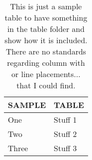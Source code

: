 \begin{table}[!ht]
\centering
\caption{This is just a sample table to have something in the table folder and show how it is included. There are no standards regarding column with or line placements... that I could find.}
~\\
\label{tab:sample-table-label}
\begin{tabular}{p{} | p{}}
\textbf{SAMPLE}		  & \textbf{TABLE}                                                                                                                                                  \\ \hline
One                   & Stuff 1 \\
Two                   & Stuff 2 \\
Three                 & Stuff 3\\ \hline
\end{tabular}
\end{table}